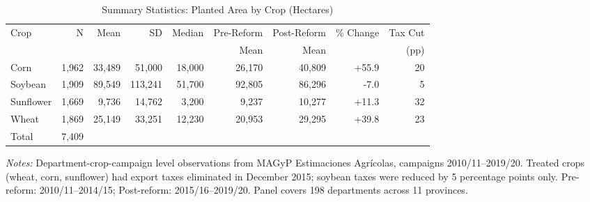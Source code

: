 \begin{table}[H]
\centering
\caption{Summary Statistics: Planted Area by Crop (Hectares)}
\label{tab:summary}
\begin{threeparttable}
\begin{adjustbox}{max width=\textwidth}
\begin{tabular}{lrrrrrrrr}
\toprule
Crop & N & Mean & SD & Median & Pre-Reform & Post-Reform & \% Change & Tax Cut \\
 & & & & & Mean & Mean & & (pp) \\
\midrule
Corn & 1,962 & 33,489 & 51,000 & 18,000 & 26,170 & 40,809 & +55.9 & 20 \\
Soybean & 1,909 & 89,549 & 113,241 & 51,700 & 92,805 & 86,296 & -7.0 & 5 \\
Sunflower & 1,669 & 9,736 & 14,762 & 3,200 & 9,237 & 10,277 & +11.3 & 32 \\
Wheat & 1,869 & 25,149 & 33,251 & 12,230 & 20,953 & 29,295 & +39.8 & 23 \\
\midrule
Total & 7,409 & & & & & & & \\
\bottomrule
\end{tabular}
\end{adjustbox}
\end{threeparttable}
\par\vspace{0.3em}
{\footnotesize \textit{Notes:} Department-crop-campaign level observations from MAGyP Estimaciones Agr\'{i}colas, campaigns 2010/11--2019/20. Treated crops (wheat, corn, sunflower) had export taxes eliminated in December 2015; soybean taxes were reduced by 5 percentage points only. Pre-reform: 2010/11--2014/15; Post-reform: 2015/16--2019/20. Panel covers 198 departments across 11 provinces.}
\end{table}


